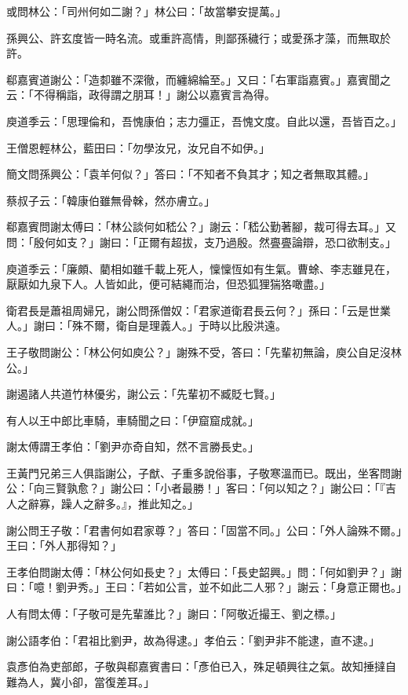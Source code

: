 或問林公：「司州何如二謝？」林公曰：「故當攀安提萬。」

孫興公、許玄度皆一時名流。或重許高情，則鄙孫穢行；或愛孫才藻，而無取於許。

郗嘉賓道謝公：「造厀雖不深徹，而纏綿綸至。」又曰：「右軍詣嘉賓。」嘉賓聞之云：「不得稱詣，政得謂之朋耳！」謝公以嘉賓言為得。

庾道季云：「思理倫和，吾愧康伯；志力彊正，吾愧文度。自此以還，吾皆百之。」

王僧恩輕林公，藍田曰：「勿學汝兄，汝兄自不如伊。」

簡文問孫興公：「袁羊何似？」答曰：「不知者不負其才；知之者無取其體。」

蔡叔子云：「韓康伯雖無骨榦，然亦膚立。」

郗嘉賓問謝太傅曰：「林公談何如嵇公？」謝云：「嵇公勤著腳，裁可得去耳。」又問：「殷何如支？」謝曰：「正爾有超拔，支乃過殷。然亹亹論辯，恐口欲制支。」

庾道季云：「廉頗、藺相如雖千載上死人，懍懍恆如有生氣。曹蜍、李志雖見在，厭厭如九泉下人。人皆如此，便可結繩而治，但恐狐狸猯狢噉盡。」

衛君長是蕭祖周婦兄，謝公問孫僧奴：「君家道衛君長云何？」孫曰：「云是世業人。」謝曰：「殊不爾，衛自是理義人。」于時以比殷洪遠。

王子敬問謝公：「林公何如庾公？」謝殊不受，答曰：「先輩初無論，庾公自足沒林公。」

謝遏諸人共道竹林優劣，謝公云：「先輩初不臧貶七賢。」

有人以王中郎比車騎，車騎聞之曰：「伊窟窟成就。」

謝太傅謂王孝伯：「劉尹亦奇自知，然不言勝長史。」

王黃門兄弟三人俱詣謝公，子猷、子重多說俗事，子敬寒溫而已。既出，坐客問謝公：「向三賢孰愈？」謝公曰：「小者最勝！」客曰：「何以知之？」謝公曰：「『吉人之辭寡，躁人之辭多。』，推此知之。」

謝公問王子敬：「君書何如君家尊？」答曰：「固當不同。」公曰：「外人論殊不爾。」王曰：「外人那得知？」

王孝伯問謝太傅：「林公何如長史？」太傅曰：「長史韶興。」問：「何如劉尹？」謝曰：「噫！劉尹秀。」王曰：「若如公言，並不如此二人邪？」謝云：「身意正爾也。」

人有問太傅：「子敬可是先輩誰比？」謝曰：「阿敬近撮王、劉之標。」

謝公語孝伯：「君祖比劉尹，故為得逮。」孝伯云：「劉尹非不能逮，直不逮。」

袁彥伯為吏部郎，子敬與郗嘉賓書曰：「彥伯已入，殊足頓興往之氣。故知捶撻自難為人，冀小卻，當復差耳。」

